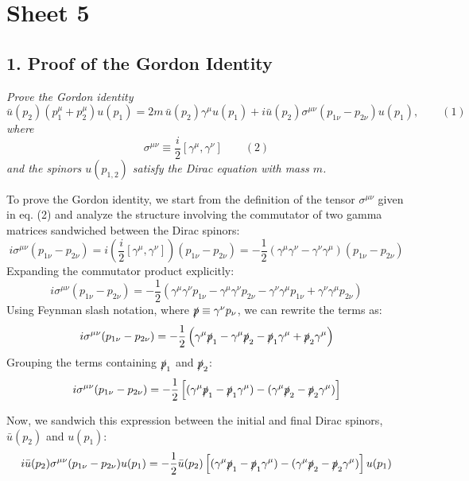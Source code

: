 \section*{Sheet 5}


\subsection*{1. Proof of the Gordon Identity}

\begin{center}
    \textit{Prove the Gordon identity}
    \[
        \bar{u}(p_2) (p_1^\mu + p_2^\mu) u(p_1) = 2 m \, \bar{u}(p_2) \gamma^\mu u(p_1) + i \bar{u}(p_2) \sigma^{\mu\nu} (p_{1\nu} - p_{2\nu}) u(p_1), \qquad (1)
    \]
    \textit{where}
    \[
        \sigma^{\mu\nu} \equiv \frac{i}{2} [\gamma^\mu, \gamma^\nu] \qquad (2)
    \]
    \textit{and the spinors $u(p_{1,2})$ satisfy the Dirac equation with mass $m$.}
\end{center}

To prove the Gordon identity, we start from the definition of the tensor $\sigma^{\mu\nu}$ given in eq. (2) and analyze the structure involving the commutator of two gamma matrices sandwiched between the Dirac spinors:
\[
    i \sigma^{\mu\nu} (p_{1\nu} - p_{2\nu}) = i \left( \frac{i}{2} [\gamma^\mu, \gamma^\nu] \right) (p_{1\nu} - p_{2\nu}) = -\frac{1}{2} (\gamma^\mu \gamma^\nu - \gamma^\nu \gamma^\mu) (p_{1\nu} - p_{2\nu})
\]
Expanding the commutator product explicitly:
\[
    i \sigma^{\mu\nu} (p_{1\nu} - p_{2\nu}) = -\frac{1}{2} \left( \gamma^\mu \gamma^\nu p_{1\nu} - \gamma^\mu \gamma^\nu p_{2\nu} - \gamma^\nu \gamma^\mu p_{1\nu} + \gamma^\nu \gamma^\mu p_{2\nu} \right)
\]
Using Feynman slash notation, where $\slashed{p} \equiv \gamma^\nu p_\nu$, we can rewrite the terms as:
\[
    i \sigma^{\mu\nu} (p_{1\nu} - p_{2\nu}) = -\frac{1}{2} \left( \gamma^\mu \slashed{p}_1 - \gamma^\mu \slashed{p}_2 - \slashed{p}_1 \gamma^\mu + \slashed{p}_2 \gamma^\mu \right)
\]
Grouping the terms containing $\slashed{p}_1$ and $\slashed{p}_2$:
\[
    i \sigma^{\mu\nu} (p_{1\nu} - p_{2\nu}) = -\frac{1}{2} \left[ (\gamma^\mu \slashed{p}_1 - \slashed{p}_1 \gamma^\mu) - (\gamma^\mu \slashed{p}_2 - \slashed{p}_2 \gamma^\mu) \right]
\]

Now, we sandwich this expression between the initial and final Dirac spinors, $\bar{u}(p_2)$ and $u(p_1)$:
\[
    i \bar{u}(p_2) \sigma^{\mu\nu} (p_{1\nu} - p_{2\nu}) u(p_1) = -\frac{1}{2} \bar{u}(p_2) \left[ (\gamma^\mu \slashed{p}_1 - \slashed{p}_1 \gamma^\mu) - (\gamma^\mu \slashed{p}_2 - \slashed{p}_2 \gamma^\mu) \right] u(p_1)
\]

